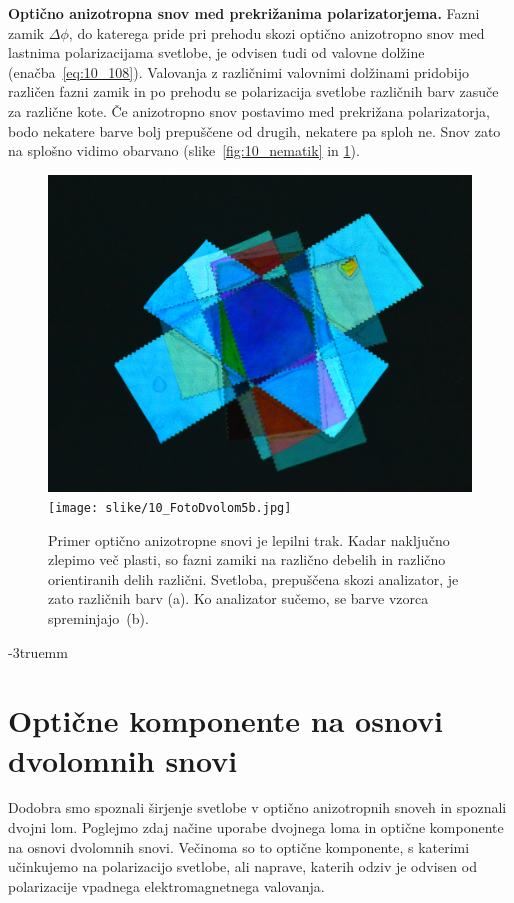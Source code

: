 \begin{example}{\bf Optično anizotropna snov med prekrižanima polarizatorjema.}
Fazni zamik $\Delta \phi$, do katerega pride pri prehodu skozi optično anizotropno snov med lastnima
polarizacijama svetlobe, je 
odvisen tudi od valovne dolžine (enačba~\ref{eq:10_108}). 
Valovanja z različnimi valovnimi dolžinami pridobijo različen fazni zamik in po prehodu se
polarizacija svetlobe različnih barv zasuče za različne kote. Če anizotropno snov 
postavimo med prekrižana polarizatorja, bodo nekatere barve bolj prepuščene
od drugih, nekatere pa sploh ne. Snov zato na splošno vidimo obarvano 
(slike~\ref{fig:10_nematik} in \ref{fig:10_dvolom_5}).
\begin{figure}[ht]
\centering
\includegraphics[width=7truecm]{slike/10_FotoDvolom5a.jpg}\hfill
\texttt{[image: slike/10\_FotoDvolom5b.jpg]}
\caption{Primer optično anizotropne snovi je lepilni trak. Kadar naključno zlepimo več 
plasti, so fazni zamiki na različno debelih in različno orientiranih delih različni. 
Svetloba, prepuščena skozi analizator, je zato različnih barv (a). Ko analizator sučemo, 
se barve vzorca spreminjajo~(b).}
\label{fig:10_dvolom_5}
\end{figure}
\vglue-3truemm
\end{example}

\section{Optične komponente na osnovi dvolomnih snovi}
\label{chap:komponente}
Dodobra smo spoznali širjenje svetlobe v optično anizotropnih snoveh in spoznali dvojni lom.
Poglejmo zdaj načine uporabe dvojnega loma in optične komponente na osnovi dvolomnih snovi.
Večinoma so to optične komponente, s katerimi učinkujemo na polarizacijo
svetlobe, ali naprave, katerih odziv je odvisen od polarizacije vpadnega elektromagnetnega valovanja.

